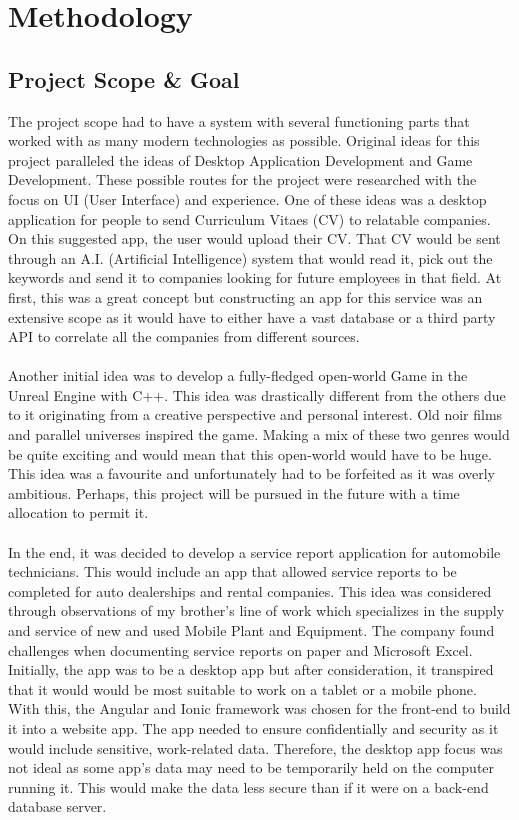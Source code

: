 \chapter{Methodology}
\section{Project Scope \& Goal}
The project scope had to have a system with several functioning parts that worked with as many modern technologies as possible. Original ideas for this project paralleled the ideas of Desktop Application Development and Game Development. These possible routes for the project were researched with the focus on UI (User Interface) and experience. One of these ideas was a desktop application for people to send Curriculum Vitaes (CV) to relatable companies. On this suggested app, the user would upload their CV. That CV would be sent through an A.I. (Artificial Intelligence) system that would read it, pick out the keywords and send it to companies looking for future employees in that field. At first, this was a great concept but constructing an app for this service was an extensive scope as it would have to either have a vast database or a third party API to correlate all the companies from different sources.
\\\\ Another initial idea was to develop a fully-fledged open-world Game in the Unreal Engine with C++. This idea was drastically different from the others due to it originating from a creative perspective and personal interest. Old noir films and parallel universes inspired the game. Making a mix of these two genres would be quite exciting and would mean that this open-world would have to be huge. This idea was a favourite and unfortunately had to be forfeited as it was overly ambitious. Perhaps, this project will be pursued in the future with a time allocation to permit it. 
\\\\ In the end, it was decided to develop a service report application for automobile technicians. This would include an app that allowed service reports to be completed for auto dealerships and rental companies. This idea was considered through observations of my brother's line of work which specializes in the supply and service of new and used Mobile Plant and Equipment. The company found challenges when documenting service reports on paper and Microsoft Excel. Initially, the app was to be a desktop app but after consideration, it transpired that it would would be most suitable to work on a tablet or a mobile phone. With this, the Angular and Ionic framework was chosen for the front-end to build it into a website app. The app needed to ensure confidentially and security as it would include sensitive, work-related data. Therefore, the desktop app focus was not ideal as some app's data may need to be temporarily held on the computer running it. This would make the data less secure than if it were on a back-end database server. \cite{ref1}
